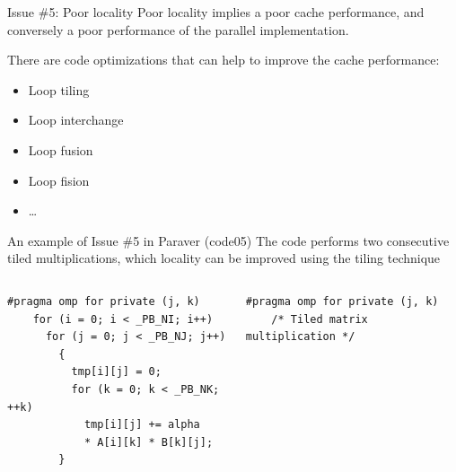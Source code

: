 \documentclass[10pt,xcolor=table]{beamer}
\begin{document}
\begin{frame}{Issue \#5: Poor locality}
Poor locality implies a poor cache performance, and conversely a poor performance of the parallel implementation. 

There are code optimizations that can help to improve the cache performance:
\begin{itemize}
    \item Loop tiling
    \item Loop interchange
    \item Loop fusion
    \item Loop fision
    \item \ldots
\end{itemize}
\end{frame}

\begin{frame}[fragile]{An example of Issue \#5 in Paraver (code05)}
The code performs two consecutive tiled multiplications, which locality can be improved using the tiling technique
\begin{columns}
\begin{column}{0.5\textwidth}
\begin{lstlisting}[style=shell,basicstyle=\scriptsize\ttfamily,gobble=3,caption={Regular matrix multiplication}]
    #pragma omp for private (j, k)
    for (i = 0; i < _PB_NI; i++)
      for (j = 0; j < _PB_NJ; j++)
        {
          tmp[i][j] = 0;
          for (k = 0; k < _PB_NK; ++k)
            tmp[i][j] += alpha 
            * A[i][k] * B[k][j];
        }

  \end{lstlisting}
  \end{column}
\begin{column}{0.5\textwidth}
  \begin{lstlisting}[style=shell,gobble=3,basicstyle=\scriptsize\ttfamily,caption={Tiled matrix multiplication}]
    #pragma omp for private (j, k)
    /* Tiled matrix multiplication */
  \end{lstlisting}
  \end{column}
  \end{columns}
\end{frame}
\end{document}
